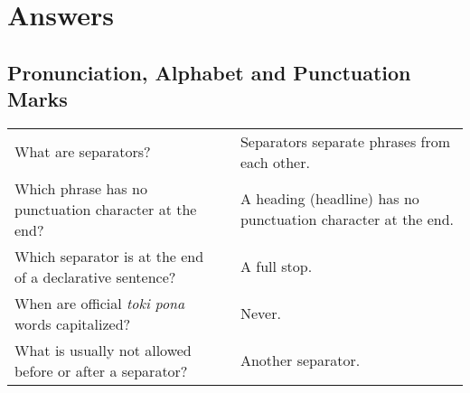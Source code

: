 \section{Answers}

\subsection*{Pronunciation, Alphabet and Punctuation Marks}
\label{'pronunciation_alphabet_answers'}
%
\begin{supertabular}{p{5,5cm}|ll}
    What are separators?                                     &  & Separators separate phrases from each other.                  \\ %
    Which phrase has no punctuation character at the end?    &  & A heading (headline) has no punctuation character at the end. \\ %
    Which separator is at the end of a declarative sentence? &  & A full stop.                                                  \\ %
    When are official \textit{toki pona} words capitalized?  &  & Never.                                                        \\ %
    What is usually not allowed before or after a separator? &  & Another separator.                                            \\ %
\end{supertabular}

\newpage
%
